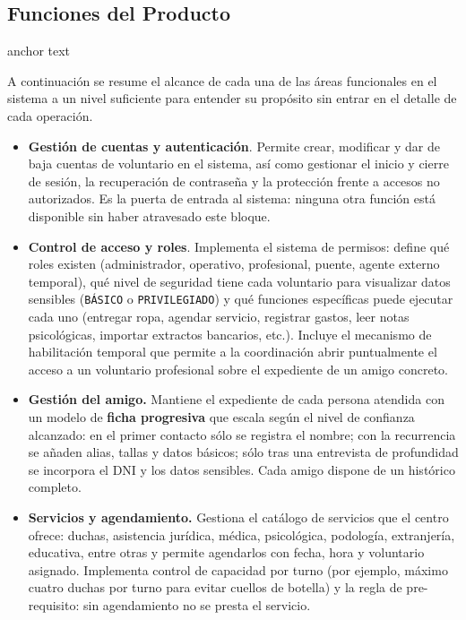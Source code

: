 \subsection{Funciones del Producto}\hypertarget{section2.2}{anchor text}
A continuación se resume el alcance de cada una de las áreas funcionales en el sistema a un nivel 
suficiente para entender su propósito sin entrar en el detalle de cada operación.
\begin{itemize}
    \item \textbf{Gestión de cuentas y autenticación}. Permite crear, modificar y dar de baja
    cuentas de voluntario en el sistema, así como gestionar el inicio y cierre de
    sesión, la recuperación de contraseña y la protección frente a accesos no
    autorizados. Es la puerta de entrada al sistema: ninguna otra función está
    disponible sin haber atravesado este bloque.

    \item \textbf{Control de acceso y roles}. Implementa el sistema de permisos: define qué
    roles existen (administrador, operativo, profesional, puente, agente externo
    temporal), qué nivel de seguridad tiene cada voluntario para visualizar datos
    sensibles (\texttt{BÁSICO} o \texttt{PRIVILEGIADO}) y qué funciones específicas puede ejecutar
    cada uno (entregar ropa, agendar servicio, registrar gastos, leer notas
    psicológicas, importar extractos bancarios, etc.). Incluye el mecanismo de
    habilitación temporal que permite a la coordinación abrir puntualmente el
    acceso a un voluntario profesional sobre el expediente de un amigo concreto.

    \item \textbf{Gestión del amigo.} Mantiene el expediente de cada persona atendida con un
    modelo de \textbf{ficha progresiva} que escala según el nivel de confianza
    alcanzado: en el primer contacto sólo se registra el nombre; con la
    recurrencia se añaden alias, tallas y datos básicos; sólo tras una entrevista
    de profundidad se incorpora el DNI y los datos sensibles. Cada amigo dispone
    de un histórico completo.

    \item \textbf{Servicios y agendamiento.} Gestiona el catálogo de servicios que el centro
    ofrece: duchas, asistencia jurídica, médica, psicológica, podología,
    extranjería, educativa, entre otras y permite agendarlos con fecha, hora y voluntario
    asignado. Implementa control de capacidad por turno (por ejemplo, máximo
    cuatro duchas por turno para evitar cuellos de botella) y la regla de
    pre-requisito: sin agendamiento no se presta el servicio.


\end{itemize}
